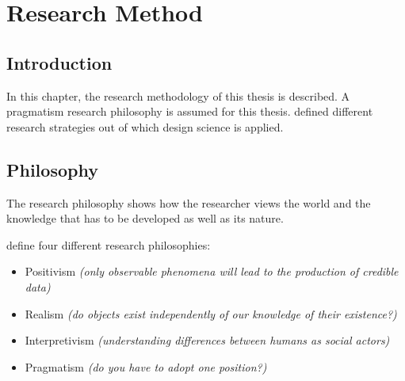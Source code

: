 
\chapter{Research Method} %

\label{Research Method} %


\section{Introduction}

In this chapter, the research methodology of this thesis is described. A pragmatism research philosophy is assumed for this thesis. \cite{Hevner2010} defined different research strategies out of which design science is applied.



\section{Philosophy}

The research philosophy shows how the researcher views the world and the knowledge that has to be developed as well as its nature.

\cite{Saunders2009} define four different research philosophies:
\begin{itemize}[noitemsep,nolistsep]
	\item Positivism \textit{(only observable phenomena will lead to the production of credible data)}
	\item Realism \textit{(do objects exist independently of our knowledge of their existence?)}
	\item Interpretivism \textit{(understanding differences between humans as social actors)}
	\item Pragmatism \textit{(do you have to adopt one position?)}
\end{itemize}


